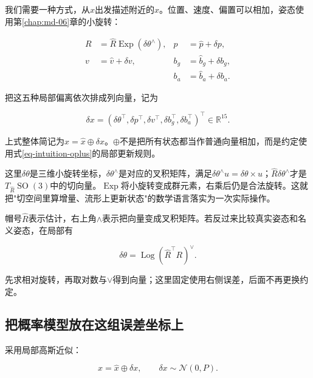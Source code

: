 我们需要一种方式，从$\hat x$出发描述附近的$x$。位置、速度、偏置可以相加，姿态使用第\ref{chap:md-06}章的小旋转：

\begin{equation}\label{eq-intuition-oplus}
\begin{aligned}
 R&=\hat R\mathop{\mathrm{Exp}}(\delta\theta^\wedge),&p&=\hat p+\delta p,\\
 v&=\hat v+\delta v,&b_g&=\hat b_g+\delta b_g,\\
 &&b_a&=\hat b_a+\delta b_a.
\end{aligned}
\end{equation}

把这五种局部偏离依次排成列向量，记为

\begin{equation*}
\delta x=(\delta\theta^\top,\delta p^\top,\delta v^\top,
                \delta b_g^\top,\delta b_a^\top)^\top\in\mathbb R^{15}.
\end{equation*}

上式整体简记为$x=\hat x\oplus\delta x$。$\oplus$不是把所有状态都当作普通向量相加，而是约定使用式\eqref{eq-intuition-oplus}的局部更新规则。

这里$\delta\theta$是三维小旋转坐标，$\delta\theta^\wedge$是对应的叉积矩阵，满足$\delta\theta^\wedge u=\delta\theta\times u$；$\hat R\delta\theta^\wedge$才是$T_{\hat R}\mathop{\mathrm{SO}}(3)$中的切向量。$\mathop{\mathrm{Exp}}$将小旋转变成群元素，右乘后仍是合法旋转。这就把"切空间里算增量、流形上更新状态"的数学语言落实为一次实际操作。

帽号$\hat R$表示估计，右上角$\wedge$表示把向量变成叉积矩阵。若反过来比较真实姿态和名义姿态，在局部有

\begin{equation*}
\delta\theta=\mathop{\mathrm{Log}}(\hat R^\top R)^\vee.
\end{equation*}

先求相对旋转，再取对数与$\vee$得到向量；这里固定使用右侧误差，后面不再更换约定。

\subsection{把概率模型放在这组误差坐标上}

采用局部高斯近似：

\begin{equation}\label{eq-intuition-local-gaussian}
\boxed{x=\hat x\oplus\delta x,\qquad\delta x\sim\mathcal N(0,P).}
\end{equation}

